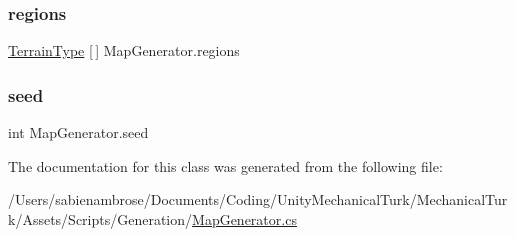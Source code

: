 \mbox{\label{class_map_generator_adaca0c66c3812a547927a6fcdd353dc7}} 
\subsubsection{\texorpdfstring{regions}{regions}}
{\footnotesize\ttfamily \mbox{\hyperlink{struct_terrain_type}{Terrain\+Type}} \mbox{[}$\,$\mbox{]} Map\+Generator.\+regions}

\mbox{\label{class_map_generator_a7ad3b7337f5252b30d873f0d76a06fcb}} 
\subsubsection{\texorpdfstring{seed}{seed}}
{\footnotesize\ttfamily int Map\+Generator.\+seed}



The documentation for this class was generated from the following file\+:\begin{DoxyCompactItemize}
\item 
/\+Users/sabienambrose/\+Documents/\+Coding/\+Unity\+Mechanical\+Turk/\+Mechanical\+Turk/\+Assets/\+Scripts/\+Generation/\mbox{\hyperlink{_map_generator_8cs}{Map\+Generator.\+cs}}\end{DoxyCompactItemize}

